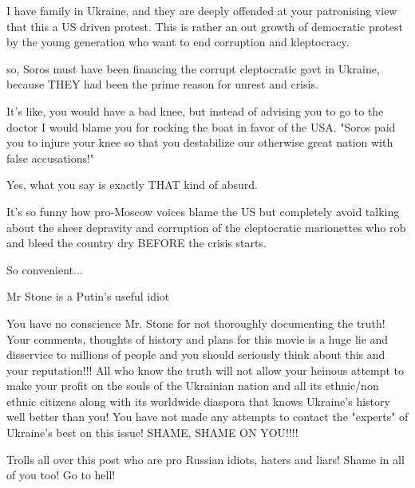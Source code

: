 \begin{itemize}

I have family in Ukraine, and they are deeply offended at your patronising view
that this a US driven protest. This is rather an out growth of democratic
protest by the young generation who want to end corruption and kleptocracy.

\begin{itemize} %

so, Soros must have been financing the corrupt cleptocratic govt in Ukraine,
because THEY had been the prime reason for unrest and crisis.

It's like, you would have a bad knee, but instead of advising you to go to the
doctor I would blame you for rocking the boat in favor of the USA. "Soros paid
you to injure your knee so that you destabilize our otherwise great nation with
false accusations!"

Yes, what you say is exactly THAT kind of absurd.


It's so funny how pro-Moscow voices blame the US but completely avoid talking
about the sheer depravity and corruption of the cleptocratic marionettes who
rob and bleed the country dry BEFORE the crisis starts.

So convenient...
\end{itemize} %

Mr Stone is a Putin's useful idiot


You have no conscience Mr. Stone for not thoroughly documenting the truth! Your
comments, thoughts of history and plans for this movie is a huge lie and
disservice to millions of people and you should seriously think about this and
your reputation!!! All who know the truth will not allow your heinous attempt
to make your profit on the souls of the Ukrainian nation and all its ethnic/non
ethnic citizens along with its worldwide diaspora that knows Ukraine's history
well better than you! You have not made any attempts to contact the "experts"
of Ukraine's best on this issue! SHAME, SHAME ON YOU!!!!

\begin{itemize} %
Trolls all over this post who are pro Russian idiots, haters and liars! Shame in all of you too! Go to hell!
\end{itemize} %



\end{itemize}
